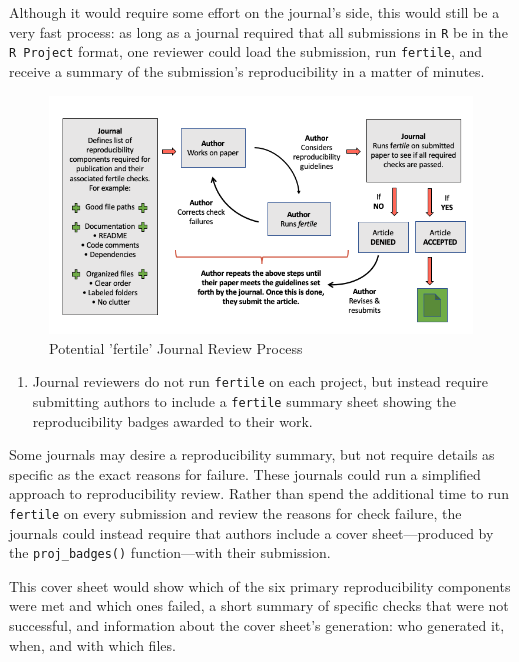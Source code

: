 \documentclass[12pt,twoside]{reedthesis}
\providecommand{\tightlist}{%
  \setlength{\itemsep}{0pt}\setlength{\parskip}{0pt}}
\begin{document}
Although it would require some effort on the journal's side, this would still be a very fast process: as long as a journal required that all submissions in \texttt{R} be in the \texttt{R\ Project} format, one reviewer could load the submission, run \texttt{fertile}, and receive a summary of the submission's reproducibility in a matter of minutes.
\begin{figure}
\includegraphics[width=1\linewidth]{figure/journal-process} \caption{Potential 'fertile' Journal Review Process}\label{fig:unnamed-chunk-71}
\end{figure}
\begin{enumerate}
\def\labelenumi{\arabic{enumi}.}
\setcounter{enumi}{1}
\tightlist
\item
  Journal reviewers do not run \texttt{fertile} on each project, but instead require submitting authors to include a \texttt{fertile} summary sheet showing the reproducibility badges awarded to their work.
\end{enumerate}
Some journals may desire a reproducibility summary, but not require details as specific as the exact reasons for failure. These journals could run a simplified approach to reproducibility review. Rather than spend the additional time to run \texttt{fertile} on every submission and review the reasons for check failure, the journals could instead require that authors include a cover sheet---produced by the \texttt{proj\_badges()} function---with their submission.

This cover sheet would show which of the six primary reproducibility components were met and which ones failed, a short summary of specific checks that were not successful, and information about the cover sheet's generation: who generated it, when, and with which files.
\end{document}
